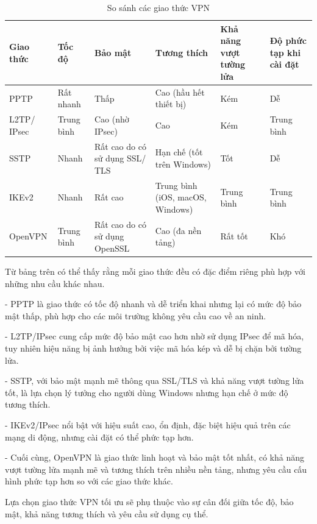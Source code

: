  \begin{table}[h!]
    \centering
    \begin{tabular}{|p{1.5cm}|p{2cm}|p{2.5cm}|p{2.5cm}|p{2.5cm}|p{2.5cm}|}
    \hline
    \textbf{Giao thức}  & \textbf{Tốc độ}  & \textbf{Bảo mật}  & \textbf{Tương thích} & \textbf{Khả năng vượt tường lửa} & \textbf{Độ phức tạp khi cài đặt} \\\hline
    PPTP               & Rất nhanh       &Thấp            & Cao (hầu hết thiết bị)          & Kém                            & Dễ                        \\\hline
    L2TP/ IPsec         & Trung bình      & Cao (nhờ IPsec) & Cao                            & Kém                            & Trung bình                \\\hline
    SSTP               & Nhanh           & Rất cao do có sử dụng SSL/ TLS & Hạn chế (tốt trên Windows)     & Tốt                            & Dễ                       \\\hline
    IKEv2       & Nhanh           & Rất cao        & Trung bình (iOS, macOS, Windows) & Trung bình                    & Trung bình                \\\hline
    OpenVPN            & Trung bình      & Rất cao do có sử dụng OpenSSL & Cao (đa nền tảng)              & Rất tốt                        & Khó        
    \\\hline
    \end{tabular}
    \caption{So sánh các giao thức VPN}
    \label{tab:VPNComparison}
\end{table}

Từ bảng trên có thể thấy rằng mỗi giao thức đều có đặc điểm riêng phù hợp với những nhu cầu khác nhau. 

- PPTP là giao thức có tốc độ nhanh và dễ triển khai nhưng lại có mức độ bảo mật thấp, phù hợp cho các môi trường không yêu cầu cao về an ninh. 

- L2TP/IPsec cung cấp mức độ bảo mật cao hơn nhờ sử dụng IPsec để mã hóa, tuy nhiên hiệu năng bị ảnh hưởng bởi việc mã hóa kép và dễ bị chặn bởi tường lửa. 

- SSTP, với bảo mật mạnh mẽ thông qua SSL/TLS và khả năng vượt tường lửa tốt, là lựa chọn lý tưởng cho người dùng Windows nhưng hạn chế ở mức độ tương thích. 

- IKEv2/IPsec nổi bật với hiệu suất cao, ổn định, đặc biệt hiệu quả trên các mạng di động, nhưng cài đặt có thể phức tạp hơn. 

- Cuối cùng, OpenVPN là giao thức linh hoạt và bảo mật tốt nhất, có khả năng vượt tường lửa mạnh mẽ và tương thích trên nhiều nền tảng, nhưng yêu cầu cấu hình phức tạp hơn so với các giao thức khác. 

Lựa chọn giao thức VPN tối ưu sẽ phụ thuộc vào sự cân đối giữa tốc độ, bảo mật, khả năng tương thích và yêu cầu sử dụng cụ thể.